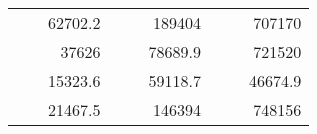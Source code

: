 \begin{table}[H]
\begin{tabular}{|ccrccrccc}
\rowcolor[HTML]{DDFDFF} 
\multicolumn{1}{|c|}{\cellcolor[HTML]{FFFFC7}}                                & \multicolumn{1}{c|}{\cellcolor[HTML]{DDFDFF}}                      & \multicolumn{1}{r|}{\cellcolor[HTML]{DAE8FC}62702.2}   & \multicolumn{1}{c|}{\cellcolor[HTML]{FFFFC7}}                                & \multicolumn{1}{c|}{\cellcolor[HTML]{DDFDFF}}                       & \multicolumn{1}{r|}{\cellcolor[HTML]{DDFDFF}189404}    & \multicolumn{1}{c|}{\cellcolor[HTML]{FFFFC7}}                                & \multicolumn{1}{c|}{\cellcolor[HTML]{DDFDFF}}                      & \multicolumn{1}{r|}{\cellcolor[HTML]{DDFDFF}707170}    \\ \cline{3-3} \cline{6-6} \cline{9-9} 
\multicolumn{1}{|c|}{\cellcolor[HTML]{FFFFC7}}                                & \multicolumn{1}{c|}{\cellcolor[HTML]{DDFDFF}}                      & \multicolumn{1}{r|}{\cellcolor[HTML]{DDFDFF}37626}     & \multicolumn{1}{c|}{\cellcolor[HTML]{FFFFC7}}                                & \multicolumn{1}{c|}{\cellcolor[HTML]{DDFDFF}}                       & \multicolumn{1}{r|}{\cellcolor[HTML]{DAE8FC}78689.9}   & \multicolumn{1}{c|}{\cellcolor[HTML]{FFFFC7}}                                & \multicolumn{1}{c|}{\cellcolor[HTML]{DDFDFF}}                      & \multicolumn{1}{r|}{\cellcolor[HTML]{DAE8FC}721520}    \\ \cline{3-3} \cline{6-6} \cline{9-9} 
\rowcolor[HTML]{DDFDFF} 
\multicolumn{1}{|c|}{\cellcolor[HTML]{FFFFC7}}                                & \multicolumn{1}{c|}{\cellcolor[HTML]{DDFDFF}}                      & \multicolumn{1}{r|}{\cellcolor[HTML]{DAE8FC}15323.6}   & \multicolumn{1}{c|}{\cellcolor[HTML]{FFFFC7}}                                & \multicolumn{1}{c|}{\cellcolor[HTML]{DDFDFF}}                       & \multicolumn{1}{r|}{\cellcolor[HTML]{DDFDFF}59118.7}   & \multicolumn{1}{c|}{\cellcolor[HTML]{FFFFC7}}                                & \multicolumn{1}{c|}{\cellcolor[HTML]{DDFDFF}}                      & \multicolumn{1}{r|}{\cellcolor[HTML]{DDFDFF}46674.9}   \\ \cline{3-3} \cline{6-6} \cline{9-9} 
\multicolumn{1}{|c|}{\cellcolor[HTML]{FFFFC7}}                                & \multicolumn{1}{c|}{\cellcolor[HTML]{DDFDFF}}                      & \multicolumn{1}{r|}{\cellcolor[HTML]{DDFDFF}21467.5}   & \multicolumn{1}{c|}{\cellcolor[HTML]{FFFFC7}}                                & \multicolumn{1}{c|}{\cellcolor[HTML]{DDFDFF}}                       & \multicolumn{1}{r|}{\cellcolor[HTML]{DAE8FC}146394}    & \multicolumn{1}{c|}{\cellcolor[HTML]{FFFFC7}}                                & \multicolumn{1}{c|}{\cellcolor[HTML]{DDFDFF}}                      & \multicolumn{1}{r|}{\cellcolor[HTML]{DAE8FC}748156}    \\ \cline{3-3} \cline{6-6} \cline{9-9} 

\end{tabular}
\end{table}
